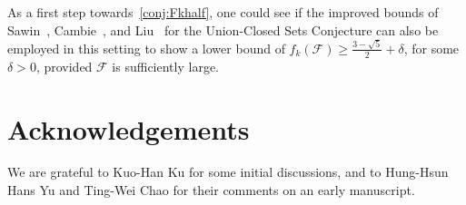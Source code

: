 \documentclass[a4paper,12pt]{article}
\theoremstyle{mystyle}	%
\theoremstyle{definition}
\newcommand{\F}{\mathcal{F}}
\newcommand{\6}{\partial}
\begin{document}
As a first step towards~\cref{conj:Fkhalf}, one could see if the improved bounds of Sawin~\cite{sawin2023improved}, Cambie~\cite{cambie2022better}, and Liu~\cite{liu2023improving} for the Union-Closed Sets Conjecture can also be employed in this setting to show a lower bound of $f_k(\F) \ge \frac{3 - \sqrt{5}}{2} + \delta$, for some $\delta > 0$, provided $\F$ is sufficiently large.

\section*{Acknowledgements}
    We are grateful to Kuo-Han Ku for some initial discussions, and to Hung-Hsun Hans Yu and Ting-Wei Chao for their comments on an early manuscript.




\end{document}
